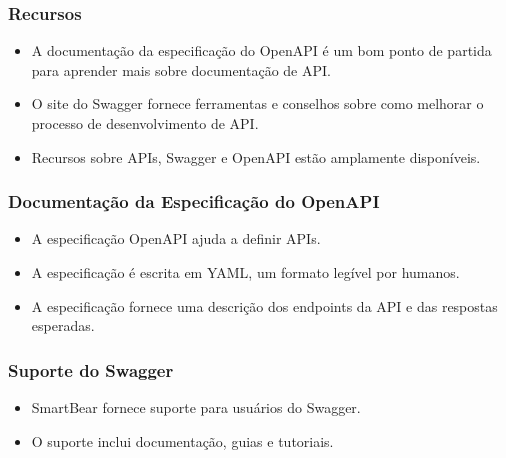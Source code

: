 \documentclass{beamer}
\begin{document}
\begin{frame}

\frametitle{Recursos}


\begin{itemize}
\item A documentação da especificação do OpenAPI é um bom ponto de partida para aprender mais sobre documentação de API.
\item O site do Swagger fornece ferramentas e conselhos sobre como melhorar o processo de desenvolvimento de API.
\item Recursos sobre APIs, Swagger e OpenAPI estão amplamente disponíveis.
\end{itemize}

\end{frame}

\begin{frame}

\frametitle{Documentação da Especificação do OpenAPI}


\begin{itemize}
\item A especificação OpenAPI ajuda a definir APIs.
\item A especificação é escrita em YAML, um formato legível por humanos.
\item A especificação fornece uma descrição dos endpoints da API e das respostas esperadas.
\end{itemize}

\end{frame}

\begin{frame}
  \frametitle{Suporte do Swagger}
  
  
  \begin{itemize}
    \item SmartBear fornece suporte para usuários do Swagger.
    \item O suporte inclui documentação, guias e tutoriais.
  \end{itemize}
  
  \end{frame}
  
\end{document}
